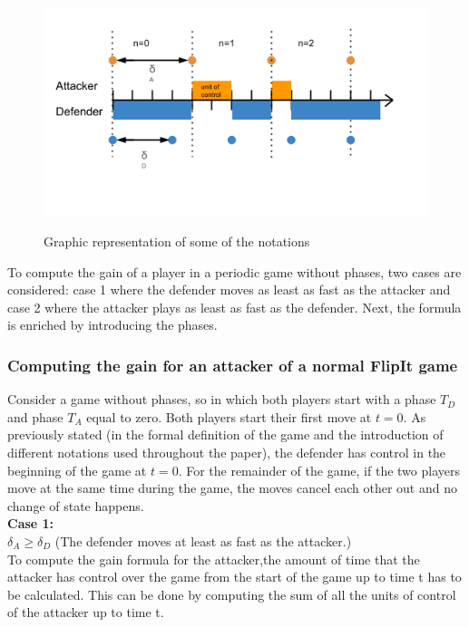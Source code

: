 \begin{figure}[hbtp]
\caption{Graphic representation of some of the notations}
\centering
\includegraphics[scale=0.8]{Images/notqties}
\label{fig:notations}
\end{figure}

To compute the gain of a player in a periodic game without phases, two cases are considered: case 1 where the defender moves as least as fast as the attacker and case 2 where the attacker plays as least as fast as the defender.  Next, the formula is enriched by introducing the phases.

\subsubsection{Computing the gain for an attacker of a normal FlipIt game}
Consider a game without phases, so in which both players start with a phase $T_{D}$ and phase $T_{A}$ equal to zero. Both players start their first move at $t=0$. As previously stated (in the formal definition of the game and the introduction of different notations used throughout the paper), the defender has control in the beginning of the game at $t=0$. For the remainder of the game, if the two players move at the same time during the game, the moves cancel each other out and no change of state happens. \\

\textbf{Case  1:} \\
$\delta_{A} \geq \delta_{D}$ (The defender moves at least as fast as the attacker.) \\



To compute the gain formula for the attacker,the amount of time that the attacker has control over the game from the start of the game up to time t has to be calculated. This can be done by computing the sum of all the units of control of the attacker up to time t. 


